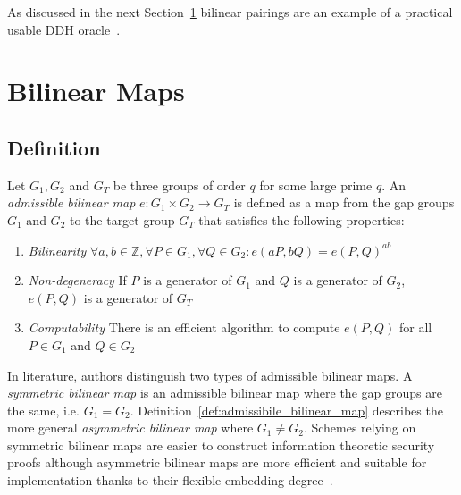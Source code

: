 As discussed in the next Section~\ref{sec:bilinear_map} bilinear pairings are an example of a practical usable DDH oracle~\cite{art:JouxN03}.

\section{Bilinear Maps}
\label{sec:bilinear_map}

\subsection{Definition}

\begin{defn}
\label{def:admissibile_bilinear_map}
 Let $G_1, G_2$ and $G_T$ be three groups of order $q$ for some large prime $q$. An \textit{admissible bilinear map} $e: G_1 \times G_2 \rightarrow G_T$ is defined as a map from the gap groups $G_1$ and $G_2$ to the target group $G_T$ that satisfies the following properties:
 \begin{enumerate}
  \item \textit{Bilinearity} $\forall a, b \in \mathbb{Z}, \forall P \in G_1, \forall Q \in G_2: e \left( aP, bQ \right) = e \left( P, Q \right)^{ab}$
  \item \textit{Non-degeneracy} If $P$ is a generator of $G_1$ and $Q$ is a generator of $G_2$, $e \left( P, Q \right)$ is a generator of $G_T$
  \item \textit{Computability} There is an efficient algorithm to compute $e \left( P, Q \right)$ for all $P \in G_1$ and $Q \in G_2$
 \end{enumerate}

\end{defn}

In literature, authors distinguish two types of admissible bilinear maps. A \textit{symmetric bilinear map} is an admissible bilinear map where the gap groups are the same, i.e. $G_1 = G_2$. Definition~\ref{def:admissibile_bilinear_map} describes the more general \textit{asymmetric bilinear map} where $G_1 \neq G_2$. Schemes relying on symmetric bilinear maps are easier to construct information theoretic security proofs although asymmetric bilinear maps are more efficient and suitable for implementation thanks to their flexible embedding degree~\cite{art:BonehF01,art:ZhangW13}.


